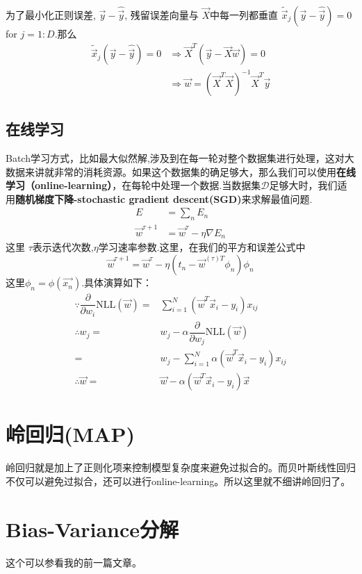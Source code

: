 \documentclass[a4paper]{article}
\begin{document}
为了最小化正则误差, $\vec{y}-\hat{\vec{y}}$, 残留误差向量与 $\vec{X}$中每一列都垂直 $\tilde{\vec{x}}_j(\vec{y}-\hat{\vec{y}})=0$ for $j=1:D$.那么
\begin{equation}\begin{split}
\tilde{\vec{x}}_j(\vec{y}-\hat{\vec{y}})=0 & \Rightarrow \vec{X}^T(\vec{y}-\vec{X}\vec{w})=0 \\
& \Rightarrow \vec{w}=(\vec{X}^T\vec{X})^{-1}\vec{X}^T\vec{y}
\end{split}\end{equation}


\subsection{在线学习}
Batch学习方式，比如最大似然解,涉及到在每一轮对整个数据集进行处理，这对大数据来讲就非常的消耗资源。如果这个数据集的确足够大，那么我们可以使用\textbf{在线学习（online-learning）}，在每轮中处理一个数据.当数据集$\mathcal{D}$足够大时，我们适用\textbf{随机梯度下降-stochastic gradient descent(SGD)}来求解最值问题.
\begin{align}
E &=\sum_{n}E_n \\
\vec{w}^{\tau+1} &= \vec{w}^{\tau}-\eta\nabla E_n
\end{align}
这里 $\tau$表示迭代次数,$\eta$学习速率参数.这里，在我们的平方和误差公式中
\begin{equation}
\vec{w}^{\tau+1} = \vec{w}^{\tau}-\eta(t_n-\vec{w}^{(\tau)T}\phi_n)\phi_n
\end{equation}
这里$\phi_n=\phi(\vec{x_n})$.具体演算如下：
\begin{align}
\because \dfrac{\partial}{\partial w_i}\text{NLL}(\vec{w})=& \sum\limits_{i=1}^N (\vec{w}^T\vec{x}_i-y_i)x_{ij} \\
\therefore w_j=& w_j - \alpha\dfrac{\partial}{\partial w_j}\text{NLL}(\vec{w}) \nonumber \\
=& w_j - \sum\limits_{i=1}^N \alpha(\vec{w}^T\vec{x}_i-y_i)x_{ij} \\
\therefore \vec{w}=& \vec{w}-\alpha(\vec{w}^T\vec{x}_i-y_i)\vec{x}
\end{align}

\section{岭回归(MAP)}
岭回归就是加上了正则化项来控制模型复杂度来避免过拟合的。而贝叶斯线性回归不仅可以避免过拟合，还可以进行online-learning。所以这里就不细讲岭回归了。

\section{Bias-Variance分解}
这个可以参看我的前一篇文章。
\end{document}
